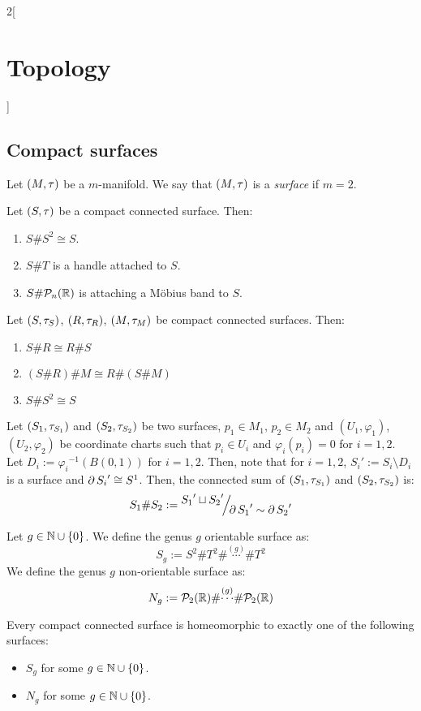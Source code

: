 \documentclass[../../../main.tex]{subfiles}
\begin{document}
\begin{multicols}{2}[\section{Topology}]
  \subsection{Compact surfaces}
  \begin{definition}
    Let $(M,\tau)$ be a $m$-manifold. We say that $(M,\tau)$ is a \emph{surface} if $m=2$.
  \end{definition}
  \begin{prop}
    Let $(S,\tau)$ be a compact connected surface. Then:
    \begin{enumerate}
      \item $S\# S^2\cong S$.
      \item $S\# T$ is a handle attached to $S$.
      \item $S\#\mathcal{P}_n(\mathbb{R})$ is attaching a Möbius band to $S$.
    \end{enumerate}
  \end{prop}
  \begin{prop}
    Let $(S,\tau_S)$, $(R,\tau_R)$, $(M,\tau_M)$ be compact connected surfaces. Then:
    \begin{enumerate}
      \item $S\# R\cong R\# S$
      \item $(S\# R)\# M\cong R\# (S\# M)$
      \item $S\#S^2\cong S$
    \end{enumerate}
  \end{prop}
  \begin{prop}
    Let $(S_1,\tau_{S_1})$ and $(S_2,\tau_{S_2})$ be two surfaces, $p_1\in M_1$, $p_2\in M_2$ and $(U_1,\varphi_1)$, $(U_2,\varphi_2)$ be coordinate charts such that $p_i\in U_i$ and $\varphi_i(p_i)=0$ for $i=1,2$. Let $D_i:={\varphi_i}^{-1}(B(0,1))$ for $i=1,2$. Then, note that for $i=1,2$, ${S_i}':=S_i\setminus D_i$ is a surface and $\operatorname{\partial} {S_i}'\cong S^1$. Then, the connected sum of $(S_1,\tau_{S_1})$ and $(S_2,\tau_{S_2})$ is: $$S_1\#S_2:=\quot{{S_1}'\sqcup{S_2}'}{\Fr {S_1}'\sim\Fr {S_2}'}$$
  \end{prop}
  \begin{definition}
    Let $g\in\mathbb{N}\cup\{0\}$. We define the genus $g$ orientable surface as: $$S_g:=S^2\#T^2\#\overset{(g)}{\cdots}\# T^2$$
    We define the genus $g$ non-orientable surface as: $$N_g:=\mathcal{P}_2(\mathbb{R})\#\overset{(g)}{\cdots}\# \mathcal{P}_2(\mathbb{R})$$
  \end{definition}
  \begin{theorem}
    Every compact connected surface is homeomorphic to exactly one of the following surfaces:
    \begin{itemize}
      \item $S_g$ for some $g\in\mathbb{N}\cup\{0\}$.
      \item $N_g$ for some $g\in\mathbb{N}\cup\{0\}$.
    \end{itemize}
  \end{theorem}
\end{multicols}
\end{document}
